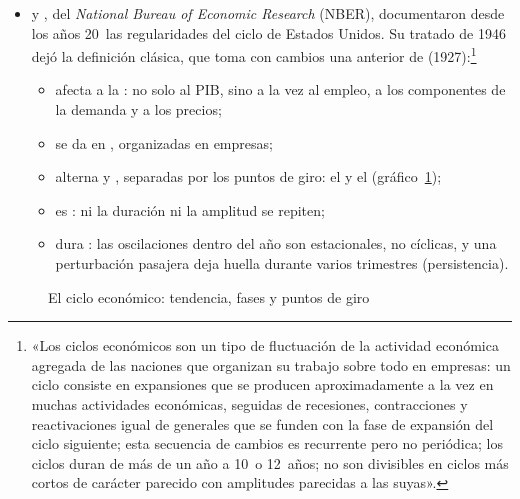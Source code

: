 \documentclass[11pt]{article}
\begin{document}
\begin{itemize}
\item {} y , del \emph{National Bureau of Economic Research} (NBER), documentaron desde los años 20~las regularidades del ciclo de Estados Unidos. Su tratado de 1946 dejó la definición clásica, que toma con cambios una anterior de  (1927):\footnote{«Los ciclos económicos son un tipo de fluctuación de la actividad económica agregada de las naciones que organizan su trabajo sobre todo en empresas: un ciclo consiste en expansiones que se producen aproximadamente a la vez en muchas actividades económicas, seguidas de recesiones, contracciones y reactivaciones igual de generales que se funden con la fase de expansión del ciclo siguiente; esta secuencia de cambios es recurrente pero no periódica; los ciclos duran de más de un año a 10~o 12~años; no son divisibles en ciclos más cortos de carácter parecido con amplitudes parecidas a las suyas»\nocite{BurnsMitchell1946Measuring}.}
  \begin{itemize}
  \item afecta a la : no solo al PIB, sino a la vez al empleo, a los componentes de la demanda y a los precios;
  \item se da en , organizadas en empresas;
  \item alterna  y , separadas por los puntos de giro: el  y el  (gráfico~\ref{fig:ciclo-tendencia});
  \item es : ni la duración ni la amplitud se repiten;
  \item dura : las oscilaciones dentro del año son estacionales, no cíclicas, y una perturbación pasajera deja huella durante varios trimestres (persistencia).
  \end{itemize}
\end{itemize}

\begin{figure}[H]
\centering
\caption{El ciclo económico: tendencia, fases y puntos de giro}\label{fig:ciclo-tendencia}
\end{figure}
\end{document}
